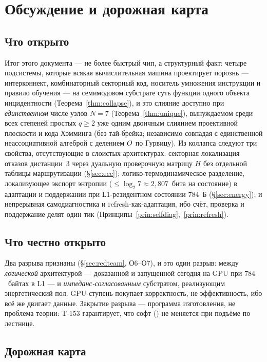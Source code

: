 \section{Обсуждение и дорожная карта}
\label{sec:discussion}

\subsection{Что открыто}

Итог этого документа --- не более быстрый чип, а структурный факт: четыре
подсистемы, которые всякая вычислительная машина проектирует порознь ---
интерконнект, комбинаторный секторный код, носитель умножения инструкции и
правило обучения --- на семимодовом субстрате суть функции одного объекта
инцидентности (Теорема~\ref{thm:collapse}), и это слияние доступно при
\emph{единственном} числе узлов $N=7$ (Теорема~\ref{thm:unique}), вынуждаемом
среди всех степеней простых $q\ge 2$ уже одним двоичным слиянием проективной
плоскости и кода Хэмминга (без тай-брейка; независимо совпадая с единственной
неассоциативной алгеброй с делением $O$ по Гурвицу). Из коллапса следуют три
свойства, отсутствующие в слоистых архитектурах: секторная локализация отказов
дистанции~$3$ через дуальную проверочную матрицу $H$ без отдельной таблицы
маршрутизации (\S\ref{sec:ecc}); логико-термодинамическое разделение,
локализующее экспорт энтропии ($\le\log_2 7\approx 2{,}807$~бита на состояние) в
адаптации и поддержании при L1-резидентном состоянии $784$~Б
(\S\ref{sec:energy}); и непрерывная самодиагностика и refresh-как-адаптация, ибо
счёт, проверка и поддержание делят один тик
(Принципы~\ref{prin:selfdiag},~\ref{prin:refresh}).

\subsection{Что честно открыто}

Два разрыва признаны (\S\ref{sec:redteam}, О6--О7), и это один разрыв: между
\emph{логической} архитектурой --- доказанной и запущенной сегодня на GPU при
$784$~байтах в L1 --- и \emph{импеданс-согласованным} субстратом, реализующим
энергетический пол. GPU-ступень покупает корректность, не эффективность, ибо всё
же двигает данные. Закрытие разрыва --- программа изготовления, не проблема теории:
T-153 гарантирует, что софт (\SYNARC{}) не меняется при подъёме по лестнице.

\subsection{Дорожная карта}

